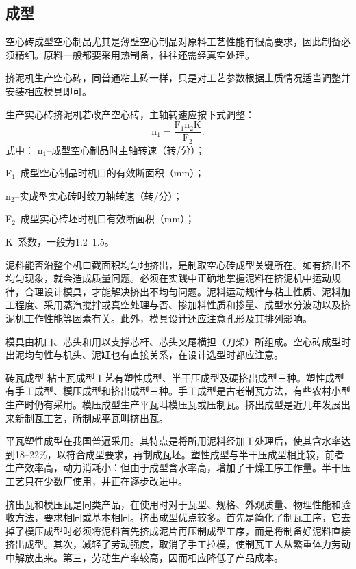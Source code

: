 \documentclass{ctexbook}
\begin{document}
\subsection{成型}
空心砖成型空心制品尤其是薄壁空心制品对原料工艺性能有很高要求，因此制备必须精细。原料一般都要采用热制备，往往还需经真空处理。

挤泥机生产空心砖，同普通粘土砖一样，只是对工艺参数根据土质情况适当调整并安装相应模具即可。

生产实心砖挤泥机若改产空心砖，主轴转速应按下式调整：
\begin{equation*}
	\text{n$_1$}=\frac{\text{F$_{1}$}\text{n$_2$}\text{K}}{\text{F$_2$}}.
\end{equation*}
式中：
n$_1$--成型空心制品时主轴转速（转/分）；

F$_1$--成型空心制品时机口的有效断面积（mm）；

n$_2$--实成型实心砖时绞刀轴转速（转/分）；

F$_2$--成型实心砖坯时机口有效断面积（mm）；

K--系数，一般为1.2--1.5。

泥料能否沿整个机口截面积均匀地挤出，是制取空心砖成型关键所在。如有挤出不均匀现象，就会造成质量问题。必须在实践中正确地掌握泥料在挤泥机中运动规律，合理设计模具，才能解决挤出不均匀问题。泥料运动规律与粘土性质、泥料加工程度、采用蒸汽搅拌或真空处理与否、掺加料性质和掺量、成型水分波动以及挤泥机工作性能等因素有关。此外，模具设计还应注意孔形及其排列影响。

模具由机口、芯头和用以支撑芯杆、芯头叉尾横担（刀架）所组成。空心砖成型时出泥均匀性与机头、泥缸也有直接关系，在设计选型时都应注意。

砖瓦成型 粘土瓦成型工艺有塑性成型、半干压成型及硬挤出成型三种。塑性成型有手工成型、模压成型和挤出成型三种。手工成型是古老制瓦方法，有些农村小型生产时仍有采用。模压成型生产平瓦叫模压瓦或压制瓦。挤出成型是近几年发展出来新制瓦工艺，所制成平瓦叫挤出瓦。

平瓦塑性成型在我国普遍采用。其特点是将所用泥料经加工处理后，使其含水率达到18--22\%，以符合成型要求，再制成瓦坯。塑性成型与半干压成型相比较，前者生产效率高，动力消耗小：但由于成型含水率高，增加了干燥工序工作量。半干压工艺只在少数厂使用，并正在逐步改进中。

挤出瓦和模压瓦是同类产品，在使用时对于瓦型、规格、外观质量、物理性能和验收方法，要求相同或基本相同。挤出成型优点较多。首先是简化了制瓦工序，它去掉了模压成型时必须将泥料首先挤成泥片再压制成型工序，而是将制备好泥料直接挤出成型。其次，减轻了劳动强度，取消了手工拉模，使制瓦工人从繁重体力劳动中解放出来。第三，劳动生产率较高，因而相应降低了产品成本。
\end{document}
